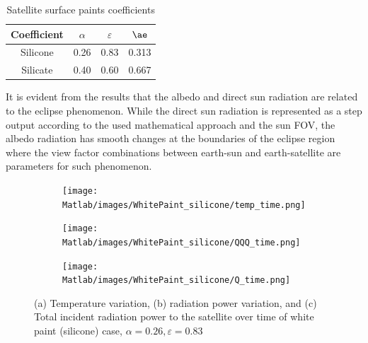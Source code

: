 \documentclass[11pt]{article}
\begin{document}
\begin{table}[H]
    \centering
    \caption{Satellite surface paints coefficients}
    \begin{tabular}{c |c c c}
    \hline
        Coefficient & $\alpha$ & $\varepsilon$ & $\ae$ \\ \hline
        Silicone &  0.26 & 0.83 & 0.313 \\
         Silicate & 0.40&0.60 & 0.667  \\ \hline
    \end{tabular}
    \label{tb:01}
\end{table}

It is evident from the results that the albedo and direct sun radiation are related to the eclipse phenomenon. While the direct sun radiation is represented as a step output according to the used mathematical approach and the sun \ac{FOV}, the albedo radiation has smooth changes at the boundaries of the eclipse region where the view factor combinations between earth-sun and earth-satellite are parameters for such phenomenon. 



 

\begin{figure}[H]
    \centering
    \begin{subfigure}[b]{1\textwidth}
        \texttt{[image: Matlab/images/WhitePaint\_silicone/temp\_time.png]}
        \caption{}
        \label{fig:temptime1}
    \end{subfigure}
    \begin{subfigure}[b]{1\textwidth}
        \texttt{[image: Matlab/images/WhitePaint\_silicone/QQQ\_time.png]}
        \caption{}
        \label{fig:QQQtimme1}
    \end{subfigure}
    \begin{subfigure}[b]{1\textwidth}
        \texttt{[image: Matlab/images/WhitePaint\_silicone/Q\_time.png]}
        \caption{}
        \label{fig:Qtimme1}
    \end{subfigure}
    \caption{(a) Temperature variation, (b) radiation power variation, and (c) Total incident radiation power to the satellite over time of white paint (silicone) case, $\alpha=0.26, \varepsilon = 0.83$}
\end{figure}
\end{document}
